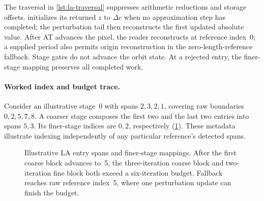The traversal in \cref{lst:la-traversal} suppresses arithmetic reductions and storage offsets.
 initializes its returned $z$ to $\Delta c$ when
no approximation step has completed; the perturbation tail then
reconstructs the first updated absolute value. After AT advances the
pixel, the reader reconstructs at reference index~0; a supplied period
also permits origin reconstruction in the zero-length-reference
fallback. Stage gates do not advance the orbit state. At a rejected
entry, the finer-stage mapping preserves all completed work.

\paragraph{Worked index and budget trace.}
Consider an illustrative stage~0 with spans $2,3,2,1$, covering raw
boundaries $0,2,5,7,8$. A coarser stage composes the first two and the
last two entries into spans $5,3$. Its finer-stage indices are $0,2$,
respectively (\cref{fig:la-stage-fallback}). These metadata illustrate
indexing independently of any particular reference's detected spans.

\begin{figure}[!htbp]
\centering
{}
\caption[LA finer-stage index mapping]{Illustrative LA entry spans and
  finer-stage mappings. After the first coarse block advances to~5,
  the three-iteration coarse block and two-iteration fine block both
  exceed a six-iteration budget. Fallback reaches raw reference
  index~5, where one perturbation update can finish the budget.}
\label{fig:la-stage-fallback}
\end{figure}

